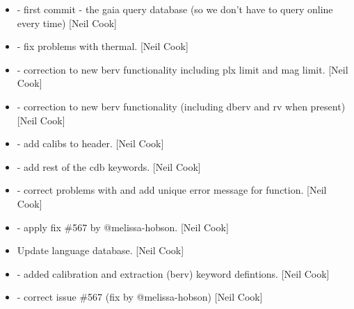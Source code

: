 \documentclass[a4paper,10pt,english]{report}
\begin{document}
\begin{itemize}
\item {} 
 - first commit - the gaia query database (so we
don’t have to query online every time) {[}Neil Cook{]}

\item {} 
 - fix problems with thermal. {[}Neil Cook{]}

\item {} 
 - correction to new berv functionality
including plx limit and mag limit. {[}Neil Cook{]}

\item {} 
 - correction to new berv functionality
(including dberv and rv when present) {[}Neil Cook{]}

\item {} 
 - add calibs to header. {[}Neil Cook{]}

\item {} 
 - add rest of the cdb keywords. {[}Neil Cook{]}

\item {} 
 - correct problems with  and add unique
error message for  function. {[}Neil Cook{]}

\item {} 
 - apply fix \#567 by @melissa-hobson. {[}Neil Cook{]}

\item {} 
Update language database. {[}Neil Cook{]}

\item {} 
 - added calibration and extraction (berv) keyword
defintions. {[}Neil Cook{]}

\item {} 
 - correct issue \#567 (fix by @melissa-hobson) {[}Neil
Cook{]}

\end{itemize}
\end{document}
